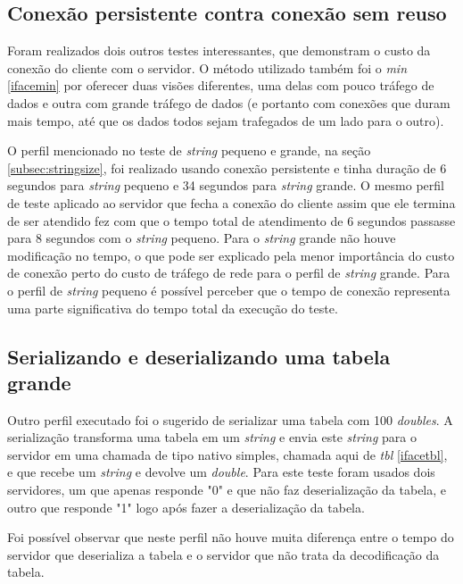 \documentclass[11pt]{article}
\begin{document}
\subsection{Conexão persistente contra conexão sem reuso}\label{subsec:persist}

Foram realizados dois outros testes interessantes, que demonstram o custo da
conexão do cliente com o servidor. O método utilizado também foi o
\textit{min} \ref{ifacemin} por oferecer duas visões diferentes, uma delas com
pouco tráfego de dados e outra com grande tráfego de dados (e portanto com
conexões que duram mais tempo, até que os dados todos sejam trafegados de um
lado para o outro).

O perfil mencionado no teste de \textit{string} pequeno e grande, na seção
\ref{subsec:stringsize}, foi realizado usando conexão persistente e tinha
duração de 6 segundos para \textit{string} pequeno e 34 segundos para
\textit{string} grande. O mesmo perfil de teste aplicado ao servidor que fecha a
conexão do cliente assim que ele termina de ser atendido fez com que o tempo
total de atendimento de 6 segundos passasse para 8 segundos com o
\textit{string} pequeno. Para o \textit{string} grande não houve modificação no
tempo, o que pode ser explicado pela menor importância do custo de conexão perto
do custo de tráfego de rede para o perfil de \textit{string} grande. Para o
perfil de \textit{string} pequeno é possível perceber que o tempo de conexão
representa uma parte significativa do tempo total da execução do teste.

\subsection{Serializando e deserializando uma tabela grande}\label{subsec:serdeser}

Outro perfil executado foi o sugerido de serializar uma tabela com 100
\textit{doubles}. A serialização transforma uma tabela em um \textit{string} e
envia este \textit{string} para o servidor em uma chamada de tipo nativo
simples, chamada aqui de \textit{tbl} \ref{ifacetbl}, e que recebe um
\textit{string} e devolve um \textit{double}. Para este teste foram usados dois
servidores, um que apenas responde "0" e que não faz deserialização da tabela, e
outro que responde "1" logo após fazer a deserialização da tabela.

Foi possível observar que neste perfil não houve muita diferença entre o tempo
do servidor que deserializa a tabela e o servidor que não trata da decodificação
da tabela.
\end{document}
